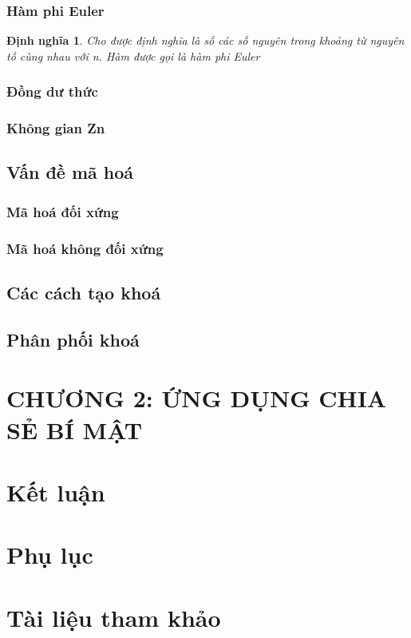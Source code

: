 \documentclass[12pt,a4paper]{report}
\newtheorem{dn}{Định nghĩa}[section]
\begin{document}
\subsection{Hàm phi Euler}

	\begin{dn}
	Cho được định nghĩa là số các số nguyên trong khoảng từ  nguyên tố cùng nhau với n. Hàm  được gọi là hàm phi Euler 
	
	\end{dn}


\subsection{Đồng dư thức}
\subsection{Không gian Zn}
\section{Vấn đề mã hoá}
\subsection{Mã hoá đối xứng}
\subsection{Mã hoá không đối xứng}
\section{Các cách tạo khoá}
\section{Phân phối khoá}
\chapter{CHƯƠNG 2: ỨNG DỤNG CHIA SẺ BÍ MẬT}
\chapter*{Kết luận}
\chapter*{Phụ lục}
\chapter*{Tài liệu tham khảo}
\end{document}

